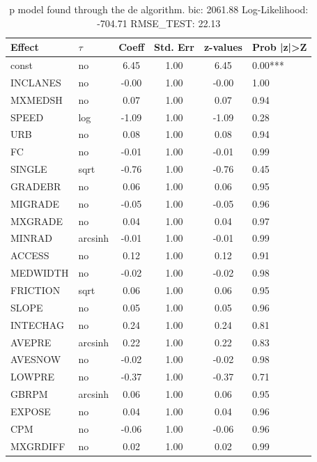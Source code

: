 \begin{table}
	\caption{p model found through the de algorithm. bic: 2061.88 Log-Likelihood: -704.71 RMSE_TEST: 22.13}
	\begin{center}
		\begin{tabular}{|l|l|c|c|c|l|}
			\hline
			Effect & $\tau$ & Coeff & Std. Err & z-values & Prob |z|>Z \\
			\hline
			const & no & 6.45 & 1.00 & 6.45 & 0.00*** \\
			\hline
			INCLANES & no & -0.00 & 1.00 & -0.00 & 1.00 \\
			\hline
			MXMEDSH & no & 0.07 & 1.00 & 0.07 & 0.94 \\
			\hline
			SPEED & log & -1.09 & 1.00 & -1.09 & 0.28 \\
			\hline
			URB & no & 0.08 & 1.00 & 0.08 & 0.94 \\
			\hline
			FC & no & -0.01 & 1.00 & -0.01 & 0.99 \\
			\hline
			SINGLE & sqrt & -0.76 & 1.00 & -0.76 & 0.45 \\
			\hline
			GRADEBR & no & 0.06 & 1.00 & 0.06 & 0.95 \\
			\hline
			MIGRADE & no & -0.05 & 1.00 & -0.05 & 0.96 \\
			\hline
			MXGRADE & no & 0.04 & 1.00 & 0.04 & 0.97 \\
			\hline
			MINRAD & arcsinh & -0.01 & 1.00 & -0.01 & 0.99 \\
			\hline
			ACCESS & no & 0.12 & 1.00 & 0.12 & 0.91 \\
			\hline
			MEDWIDTH & no & -0.02 & 1.00 & -0.02 & 0.98 \\
			\hline
			FRICTION & sqrt & 0.06 & 1.00 & 0.06 & 0.95 \\
			\hline
			SLOPE & no & 0.05 & 1.00 & 0.05 & 0.96 \\
			\hline
			INTECHAG & no & 0.24 & 1.00 & 0.24 & 0.81 \\
			\hline
			AVEPRE & arcsinh & 0.22 & 1.00 & 0.22 & 0.83 \\
			\hline
			AVESNOW & no & -0.02 & 1.00 & -0.02 & 0.98 \\
			\hline
			LOWPRE & no & -0.37 & 1.00 & -0.37 & 0.71 \\
			\hline
			GBRPM & arcsinh & 0.06 & 1.00 & 0.06 & 0.95 \\
			\hline
			EXPOSE & no & 0.04 & 1.00 & 0.04 & 0.96 \\
			\hline
			CPM & no & -0.06 & 1.00 & -0.06 & 0.96 \\
			\hline
			MXGRDIFF & no & 0.02 & 1.00 & 0.02 & 0.99 \\

\end{tabular}
\end{center}
\end{table}
